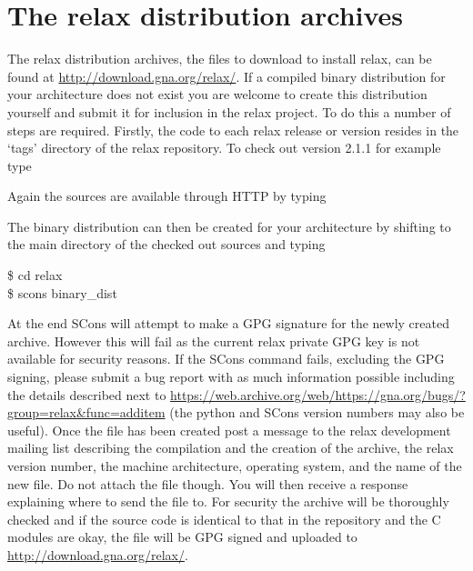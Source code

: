 
\section{The relax distribution archives}

The relax distribution archives, the files to download to install relax, can be found at \href{http://download.gna.org/relax/}{http://download.gna.org/relax/}.
If a compiled binary distribution for your architecture does not exist you are welcome to create this distribution yourself and submit it for inclusion in the relax project.
To do this a number of steps are required.
Firstly, the code to each relax release or version resides in the `tags' directory of the relax repository.
To check out version 2.1.1 for example type


Again the sources are available through HTTP by typing


The binary distribution can then be created for your architecture by shifting to the main directory of the checked out sources and typing

\begin{exampleenv}
\$ cd relax \\
\$ scons binary\_dist
\end{exampleenv}

At the end SCons will attempt to make a GPG signature for the newly created archive.
However this will fail as the current relax private GPG key is not available for security reasons.
If the SCons command fails, excluding the GPG signing, please submit a bug report with as much information possible including the details described next to \href{https://web.archive.org/web/https://gna.org/bugs/?group=relax\&func=additem}{https://web.archive.org/web/https://gna.org/bugs/?group=relax\&func=additem} (the python and SCons version numbers may also be useful).
Once the file has been created post a message to the relax development mailing list describing the compilation and the creation of the archive, the relax version number, the machine architecture, operating system, and the name of the new file.
Do not attach the file though.
You will then receive a response explaining where to send the file to.
For security the archive will be thoroughly checked and if the source code is identical to that in the repository and the C modules are okay, the file will be GPG signed and uploaded to \href{http://download.gna.org/relax/}{http://download.gna.org/relax/}.
